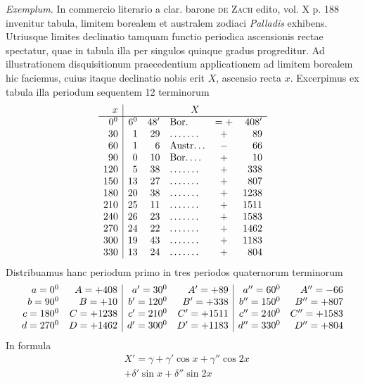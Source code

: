 \textit{Exemplum.} In commercio literario a clar. barone \textsc{de Zach} edito,
vol. X p. 188 invenitur tabula, limitem borealem et australem zodiaci
\textit{Palladis} exhibens. Utriusque limites declinatio tamquam functio periodica
ascensionis rectae spectatur, quae in tabula illa per singulos quinque gradus
progreditur. Ad illustrationem disquisitionum praecedentium applicationem ad
limitem borealem hic faciemus, cuius itaque declinatio nobis erit $X$, ascensio
recta $x$. Excerpimus ex tabula illa periodum sequentem 12 terminorum
{\small\setlength{\arraycolsep}{3pt}\[
\begin{array}{r|r r l c r}
x&\multicolumn{5}{c}{X}\\ \hline
0^{\mathord{0}}&6^{\mathord{0}}&48'&\text{Bor.}&=+&408'\\
30&1&29&.\,.\,.\,.\,.\,.\,.&+&89\\
60&1&6&\text{Austr.}\,.\,.&-&66\\
90&0&10&\text{Bor.}\,.\,.\,.&+&10\\
120&5&38&.\,.\,.\,.\,.\,.\,.&+&338\\
150&13&27&.\,.\,.\,.\,.\,.\,.&+&807\\
180&20&38&.\,.\,.\,.\,.\,.\,.&+&1238\\
210&25&11&.\,.\,.\,.\,.\,.\,.&+&1511\\
240&26&23&.\,.\,.\,.\,.\,.\,.&+&1583\\
270&24&22&.\,.\,.\,.\,.\,.\,.&+&1462\\
300&19&43&.\,.\,.\,.\,.\,.\,.&+&1183\\
330&13&24&.\,.\,.\,.\,.\,.\,.&+&804
\end{array}
\]}
Distribuamus hanc periodum primo in tres periodos quaternorum terminorum
{\small\setlength{\arraycolsep}{3pt}\[
\begin{array}{r r|r r|r r}
a=0^{\mathord{0}}&A=+408&a'=30^{\mathord{0}}&A'=+89&a''=60^{\mathord{0}}&A''=-66\\
b=90^{\mathord{0}}&B=+10&b'=120^{\mathord{0}}&B'=+338&b''=150^{\mathord{0}}&B''=+807\\
c=180^{\mathord{0}}&C=+1238&c'=210^{\mathord{0}}&C'=+1511&c''=240^{\mathord{0}}&C''=+1583\\
d=270^{\mathord{0}}&D=+1462&d'=300^{\mathord{0}}&D'=+1183&d''=330^{\mathord{0}}&D''=+804
\end{array}
\]}
In formula
\[
\begin{aligned}
&X'={}\gamma+\gamma'\cos x+\gamma''\cos2x\\[5pt]
&+\delta'\sin x+\delta''\sin2x
\end{aligned}
\]
